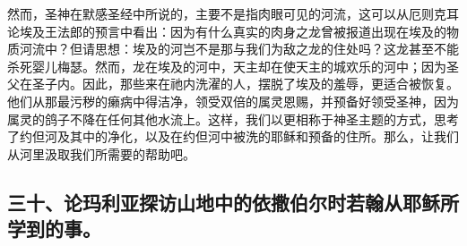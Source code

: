 然而，圣神在默感圣经中所说的，主要不是指肉眼可见的河流，这可以从厄则克耳论埃及王法郎的预言中看出：因为有什么真实的肉身之龙曾被报道出现在埃及的物质河流中？但请思想：埃及的河岂不是那与我们为敌之龙的住处吗？这龙甚至不能杀死婴儿梅瑟。然而，龙在埃及的河中，天主却在使天主的城欢乐的河中；因为圣父在圣子内。因此，那些来在祂内洗濯的人，摆脱了埃及的羞辱，更适合被恢复。他们从那最污秽的癞病中得洁净，领受双倍的属灵恩赐，并预备好领受圣神，因为属灵的鸽子不降在任何其他水流上。这样，我们以更相称于神圣主题的方式，思考了约但河及其中的净化，以及在约但河中被洗的耶稣和预备的住所。那么，让我们从河里汲取我们所需要的帮助吧。\par


\subsection{三十、论玛利亚探访山地中的依撒伯尔时若翰从耶稣所学到的事。}

